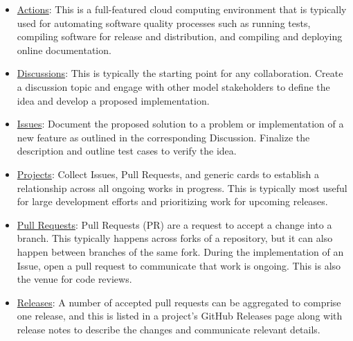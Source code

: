 \documentclass[]{nrel}
\begin{document}
\begin{itemize}
\item \href{https://github.com/features/actions}{Actions}: This is a full-featured cloud computing
environment that is typically used for automating software quality processes such as
running tests, compiling software for release and distribution, and compiling and deploying
online documentation.

\item \href{https://docs.github.com/en/discussions}{Discussions}: This is typically the starting point
for any collaboration. Create a discussion topic and engage with other model stakeholders
to define the idea and develop a proposed implementation.

\item \href{https://docs.github.com/en/issues/tracking-your-work-with-issues/about-issues}{Issues}:
Document the proposed solution to a problem or implementation of a new feature as outlined
in the corresponding Discussion. Finalize the description and outline test cases to verify
the idea.

\item \href{https://docs.github.com/en/issues/planning-and-tracking-with-projects/learning-about-projects/about-projects}{Projects}:
Collect Issues, Pull Requests, and generic cards to establish a relationship across all
ongoing works in progress. This is typically most useful for large development efforts
and prioritizing work for upcoming releases.

\item \href{https://docs.github.com/en/pull-requests/collaborating-with-pull-requests/proposing-changes-to-your-work-with-pull-requests/about-pull-requests}{Pull Requests}:
Pull Requests (PR) are a request to accept a change into a branch. This typically happens
across forks of a repository, but it can also happen between branches of the same fork.
During the implementation of an Issue, open a pull request to communicate that work is
ongoing. This is also the venue for code reviews.

\item \href{https://docs.github.com/en/repositories/releasing-projects-on-github/about-releases}{Releases}:
A number of accepted pull requests can be aggregated to comprise one release, and this is
listed in a project’s GitHub Releases page along with release notes to describe the changes
and communicate relevant details.

\end{itemize}
\end{document}
